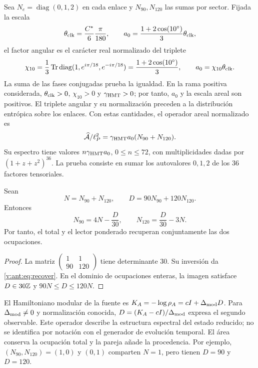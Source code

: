 Sea $N_e=\operatorname{diag}(0,1,2)$ en cada enlace y
$N_{90},N_{120}$ las sumas por sector. Fijada la escala
\[
\theta_{\rm clk}=\frac{C^*}{6}\frac{\pi}{180},\qquad
a_0=\frac{1+2\cos(10^\circ)}3\theta_{\rm clk},
\]
el factor angular es el carácter real normalizado del triplete
\begin{equation}
 \chi_{10}=\frac13\operatorname{Tr}\operatorname{diag}
       (1,e^{i\pi/18},e^{-i\pi/18})
 =\frac{1+2\cos(10^\circ)}3,
 \qquad a_0=\chi_{10}\theta_{\rm clk}.
 \label{v:ant:eq:ii-area-caracter-triplete}
\end{equation}
La suma de las fases conjugadas prueba la igualdad. En la rama positiva
considerada, \(\theta_{\rm clk}>0\), \(\chi_{10}>0\) y
\(\gamma_{\mathrm{HMT}}>0\); por tanto, \(a_0\) y la escala areal son
positivos. El triplete angular y su normalización preceden a la
distribución entrópica sobre los enlaces. Con estas cantidades,
el operador areal normalizado es
\[
\widehat{\mathcal A}/\ell_P^2
=\gamma_{\mathrm{HMT}}a_0(N_{90}+N_{120}).
\]
Su espectro tiene valores $n\gamma_{\mathrm{HMT}}a_0$, $0\le n\le72$,
con multiplicidades dadas por $(1+z+z^2)^{36}$.
La prueba consiste en sumar los autovalores $0,1,2$ de los
36 factores tensoriales.

\begin{theorem}
Sean
\[
N=N_{90}+N_{120},\qquad D=90N_{90}+120N_{120}.
\]
Entonces
\begin{equation}
N_{90}=4N-\frac D{30},\qquad
N_{120}=\frac D{30}-3N.
\label{v:ant:eq:recover}
\end{equation}
Por tanto, el total y el lector ponderado recuperan conjuntamente
las dos ocupaciones.
\end{theorem}
\begin{proof}
La matriz $\left(\begin{smallmatrix}1&1\\90&120\end{smallmatrix}\right)$
tiene determinante $30$. Su inversión da \eqref{v:ant:eq:recover}.
En el dominio de ocupaciones enteras, la imagen satisface
$D\in30\mathbb Z$ y $90N\le D\le120N$.
\end{proof}

El Hamiltoniano modular de la fuente es
$K_A=-\log\rho_A=cI+\Delta_{\rm mod}D$.
Para $\Delta_{\rm mod}\ne0$ y normalización conocida,
$D=(K_A-cI)/\Delta_{\rm mod}$ expresa el segundo observable.
Este operador describe la estructura espectral del estado reducido;
no se identifica por notación con el generador de evolución temporal.
El área conserva la ocupación total y la pareja añade la procedencia.
Por ejemplo, $(N_{90},N_{120})=(1,0)$ y $(0,1)$ comparten $N=1$,
pero tienen $D=90$ y $D=120$.


